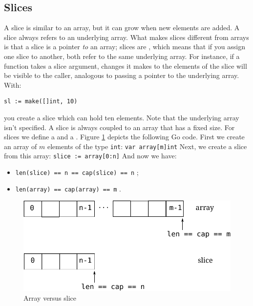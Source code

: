 \subsection{Slices}
\label{sec:slices}
A slice is similar to an array, but it can grow when new elements
are added.
A slice always refers to an underlying array. What makes slices different
from
arrays is that a slice is a pointer \emph{to} an array;
slices are , 
which means that if you assign one slice to
another, both refer to the same underlying array. For instance, if a
function takes a slice argument, changes it makes to the elements of the
slice will be visible to the caller, analogous to passing a pointer to
the underlying array. With:
\begin{lstlisting}
sl := make([]int, 10)
\end{lstlisting}
you create a slice which can hold ten elements. Note that the
underlying array isn't specified.
A slice is always coupled to an array that has
a fixed size. For slices we define a  and a
. 
Figure \ref{fig:array-vs-slice} depicts the following Go code.
First we create an array of $m$ elements of the type \lstinline{int}:
\lstinline{var array[m]int}\newline
Next, we create a slice from this array:
\lstinline{slice := array[0:n]}\newline
And now we have:
\begin{itemize}
\item{\lstinline{len(slice) == n == cap(slice) == n}{} ;}
\item{\lstinline{len(array) == cap(array) == m}{} .}
\end{itemize}
\begin{figure}[H]
\caption{Array versus slice}
\label{fig:array-vs-slice}
\begin{center}
\includegraphics[scale=0.65]{fig/array-vs-slice.pdf}
\end{center}
\end{figure}

